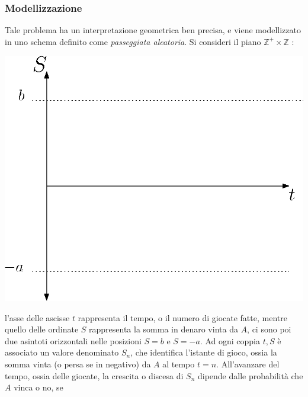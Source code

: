 \documentclass[12pt, letterpaper]{article}
\begin{document}
\subsubsection{Modellizzazione}
Tale problema ha un interpretazione geometrica ben precisa, e viene modellizzato in uno schema 
definito come \textit{passeggiata aleatoria}. Si consideri il piano \(\mathbb{Z}^+\times \mathbb{Z}\) : \\\begin{center}
    
    \includegraphics[scale=0.65]{images/PasseggiataAleatoriaPiano.eps}
\end{center}
l'asse 
delle ascisse \(t\) rappresenta il tempo, o il numero 
di giocate fatte, mentre quello delle ordinate \(S\) rappresenta la somma in denaro vinta da \(A\), ci sono poi 
due asintoti orizzontali nelle posizioni \(S=b\) e \(S=-a\).
Ad ogni coppia \(t,S\) è associato un valore denominato \(S_n\), che identifica l'istante di gioco, 
ossia la somma vinta (o persa se in negativo) da \(A\) al tempo \(t=n\). All'avanzare del tempo, ossia 
delle giocate, la crescita o discesa di \(S_n\) dipende dalle probabilità che \(A\) vinca o no, se 
\end{document}
